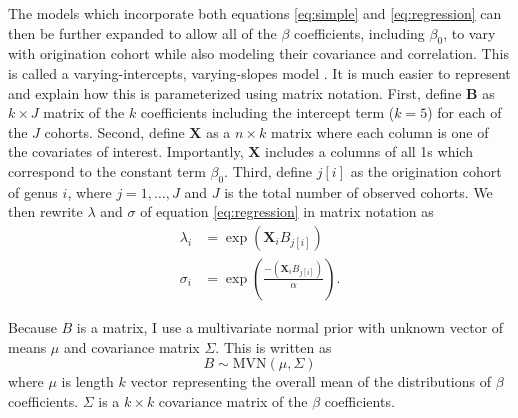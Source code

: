 \documentclass[12pt,letterpaper]{article}
\begin{document}
The models which incorporate both equations \ref{eq:simple} and \ref{eq:regression} can then be further expanded to allow all of the \(\beta\) coefficients, including \(\beta_{0}\), to vary with origination cohort while also modeling their covariance and correlation. This is called a varying-intercepts, varying-slopes model \citep{Gelman2007}. It is much easier to represent and explain how this is parameterized using matrix notation. First, define \(\mathbf{B}\) as \(k \times J\) matrix of the \(k\) coefficients including the intercept term (\(k = 5\)) for each of the \(J\) cohorts. Second, define \(\mathbf{X}\) as a \(n \times k\) matrix where each column is one of the covariates of interest. Importantly, \(\mathbf{X}\) includes a columns of all 1s which correspond to the constant term \(\beta_{0}\). Third, define \(j[i]\) as the origination cohort of genus \(i\), where \(j = 1, \dots, J\) and \(J\) is the total number of observed cohorts. We then rewrite \(\lambda\) and \(\sigma\) of equation \ref{eq:regression} in matrix notation as
\begin{equation}
  \begin{aligned}
    \lambda_{i} &= \exp(\mathbf{X}_{i} B_{j[i]}) \\
    \sigma_{i} &= \exp\left(\frac{-(\mathbf{X}_{i} B_{j[i]})}{\alpha}\right). 
  \end{aligned}
  \label{eq:multivariate}
\end{equation}

Because \(B\) is a matrix, I use a multivariate normal prior with unknown vector of means \(\mu\) and covariance matrix \(\Sigma\). This is written as 
\begin{equation}
  B \sim \mathrm{MVN}(\mu, \Sigma)
  \label{eq:beta_prior}
\end{equation}
where \(\mu\) is length \(k\) vector representing the overall mean of the distributions of \(\beta\) coefficients. \(\Sigma\) is a \(k \times k\) covariance matrix of the \(\beta\) coefficients.
\end{document}

